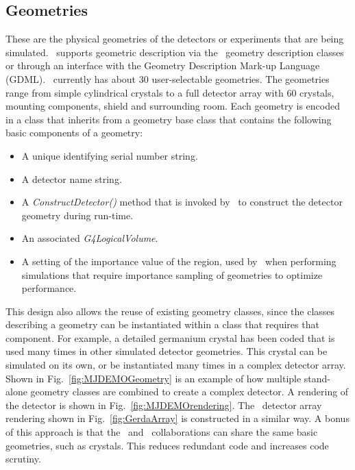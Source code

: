 \documentclass[article]{IEEEtran}
\begin{document}
\subsection{Geometries}
\label{se:geometries}
These are the physical geometries of the detectors or experiments that are being simulated. \MaGe\ 
supports geometric description via the \GF\ geometry description classes or through an 
interface with the Geometry Description Mark-up Language~\cite{gdml} (GDML). 
\MaGe\ currently has about 30 user-selectable geometries. The geometries 
range from simple cylindrical crystals to a full detector array with 60 crystals, mounting 
components, shield and surrounding room. Each geometry is encoded in a class that inherits
from a geometry base class that contains the following basic components of a
geometry:
\begin{itemize}
\item A unique identifying serial number string.
\item A detector name string. 
\item A \emph{ConstructDetector()} method that is invoked by \GF\ to construct the detector geometry during run-time. 
\item An associated \emph{G4LogicalVolume}.
\item A setting of the importance value of the region, used by \GF\ 
when performing simulations that require importance sampling of geometries to optimize performance. 
\end{itemize}
This design also allows the reuse of existing geometry classes, since
the classes describing a geometry can be instantiated within a class
that requires that component. For example, a detailed germanium
crystal has been coded that is used many times in other simulated
detector geometries. This crystal can be simulated on its own, or be
instantiated many times in a complex detector array. Shown in
Fig.~\ref{fig:MJDEMOGeometry} is an example of how multiple
stand-alone geometry classes are combined to create a complex detector. A rendering of the detector is shown in Fig.~\ref{fig:MJDEMOrendering}. The \Gerda\ detector array rendering shown
in Fig.~\ref{fig:GerdaArray} is constructed in a similar way. A bonus
of this approach is that the \Gerda\ and \MJ\ collaborations can share
the same basic geometries, such as crystals. This reduces redundant
code and increases code scrutiny.
\end{document}
